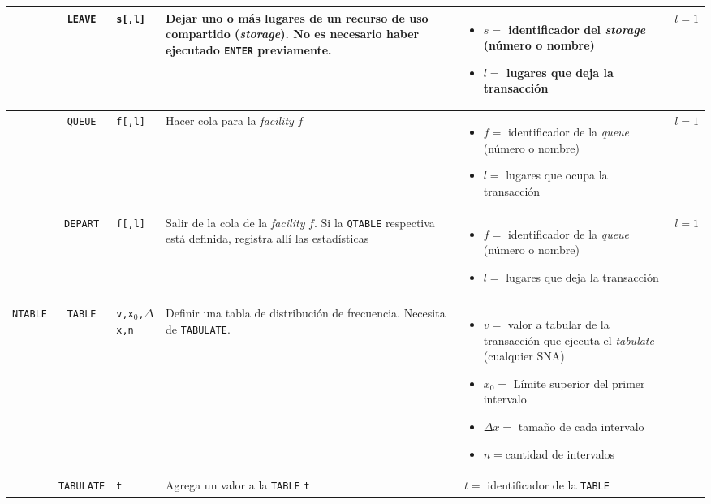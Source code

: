 \documentclass{article}
\providecommand{\tabularnewline}{\\}
\begin{document}
\begin{longtable}{|lc>{\raggedright}p{}|>{\raggedright}p{}|>{\raggedright}p{}|>{\raggedright}p{}|}
\hline
& \texttt{LEAVE} & \texttt{s[,l]} &
Dejar uno o más lugares de un recurso de uso compartido (\emph{storage}).
No es necesario haber ejecutado \texttt{ENTER} previamente. &
\begin{itemize}
  \item $s=$ identificador del \emph{storage} (número o nombre)
  \item $l=$ lugares que deja la transacción
\end{itemize} &
$l=1$ \tabularnewline

\hline
& \texttt{QUEUE} & \texttt{f[,l]} &
Hacer cola para la \emph{facility} $f$ &
\begin{itemize}
  \item $f=$ identificador de la \emph{queue} (número o nombre)
  \item $l=$ lugares que ocupa la transacción
\end{itemize} &
$l=1$ \tabularnewline

\hline
& \texttt{DEPART} & \texttt{f[,l]} &
Salir de la cola de la \emph{facility} $f$.
Si la \texttt{QTABLE} respectiva está definida, registra allí las estadísticas &
\begin{itemize}
  \item $f=$ identificador de la \emph{queue} (número o nombre)
  \item $l=$ lugares que deja la transacción
\end{itemize} &
$l=1$ \tabularnewline

\hline
\pagebreak

\hline
\multicolumn{6}{c}{\textbf{Tabulación de datos}} \tabularnewline

\hline
\texttt{NTABLE} & \texttt{TABLE} & \texttt{v,x$_{0}$,$\Delta$x,n} &
Definir una tabla de distribución de frecuencia. Necesita de \texttt{TABULATE}. &
\begin{itemize}
  \item $v=$ valor a tabular de la transacción que ejecuta el \emph{tabulate} (cualquier SNA)
  \item $x_{0}=$ Límite superior del primer intervalo
  \item $\Delta x=$ tamaño de cada intervalo
  \item $n=$cantidad de intervalos
\end{itemize} & \tabularnewline

\hline
& \texttt{TABULATE} & \texttt{t} &
Agrega un valor a la \texttt{TABLE} \texttt{t} &
$t=$ identificador de la \texttt{TABLE} & \tabularnewline


\end{longtable}
\end{document}
